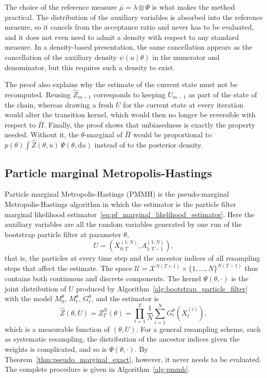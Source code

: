 The choice of the reference measure $\bar{\mu} = \lambda\otimes\Psi$ is what makes the method practical. The distribution of the auxiliary variables is absorbed into the reference measure, so it cancels from the acceptance ratio and never has to be evaluated, and it does not even need to admit a density with respect to any standard measure. In a density-based presentation, the same cancellation appears as the cancellation of the auxiliary density $\psi(u\mid\theta)$ in the numerator and denominator, but this requires such a density to exist.

The proof also explains why the estimate of the current state must not be recomputed. Reusing $\hat{Z}_{m-1}$ corresponds to keeping $U_{m-1}$ as part of the state of the chain, whereas drawing a fresh $U$ for the current state at every iteration would alter the transition kernel, which would then no longer be reversible with respect to $\bar{\Pi}$. Finally, the proof shows that unbiasedness is exactly the property needed. Without it, the $\theta$-marginal of $\bar{\Pi}$ would be proportional to $p(\theta)\int\hat{Z}(\theta,u)\,\Psi(\theta,\mathrm{d}u)$ instead of to the posterior density.

\subsection{Particle marginal Metropolis-Hastings}
\label{sec:pmmh}
Particle marginal Metropolis-Hastings (PMMH) \cite{andrieu2010particle} is the pseudo-marginal Metropolis-Hastings algorithm in which the estimator is the particle filter marginal likelihood estimator~\eqref{eq:pf_marginal_likelihood_estimator}. Here the auxiliary variables are all the random variables generated by one run of the bootstrap particle filter at parameter $\theta$,
\begin{equation}
    U = \left(X_{0:T}^{(1:N)},A_{1:T-1}^{(1:N)}\right),
\end{equation}
that is, the particles at every time step and the ancestor indices of all resampling steps that affect the estimate. The space $\mathcal{U} = \mathcal{X}^{N(T+1)}\times\{1,\ldots,N\}^{N(T-1)}$ thus contains both continuous and discrete components. The kernel $\Psi(\theta,\cdot)$ is the joint distribution of $U$ produced by Algorithm~\ref{alg:bootstrap_particle_filter} with the model $M_0^\theta$, $M_t^\theta$, $G_t^\theta$, and the estimator is
\begin{equation}
    \hat{Z}(\theta,U) = Z_T^N(\theta) = \prod_{t=1}^{T}\frac{1}{N}\sum_{i=1}^{N}G_t^\theta(X_t^{(i)}),
\end{equation}
which is a measurable function of $(\theta,U)$. For a general resampling scheme, such as systematic resampling, the distribution of the ancestor indices given the weights is complicated, and so is $\Psi(\theta,\cdot)$. By Theorem~\ref{thm:pseudo_marginal_exact}, however, it never needs to be evaluated. The complete procedure is given in Algorithm~\ref{alg:pmmh}.

